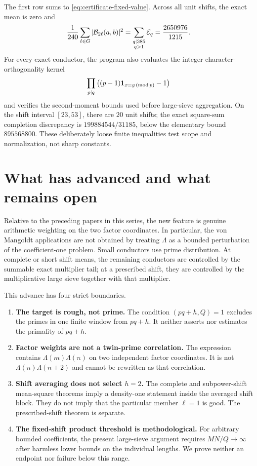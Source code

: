 The first row sums to \eqref{eq:certificate-fixed-value}.  Across all unit shifts, the exact mean is zero and
\begin{equation}\label{eq:certificate-weighted-parseval}
 \frac1{240}\sum_{\ell\in G}|\mathcal B_{2\ell}(a,b)|^2
 =\sum_{\substack{q\mid385\\q>1}}\mathcal E_q
 =\frac{2650976}{1215}.
\end{equation}
For every exact conductor, the program also evaluates the integer character-orthogonality kernel
\[
 \prod_{p\mid q}
 \left((p-1)\mathbf 1_{x\equiv y\, (\mathrm{mod}\,p)}-1\right)
\]
and verifies the second-moment bounds used before large-sieve aggregation.  On the shift interval $[23,53]$, there are $20$ unit shifts; the exact square-sum completion discrepancy is $199884544/31185$, below the elementary bound $895568800$.  These deliberately loose finite inequalities test scope and normalization, not sharp constants.

\section{What has advanced and what remains open}\label{sec:boundaries}

Relative to the preceding papers in this series, the new feature is genuine arithmetic weighting on the two factor coordinates.  In particular, the von Mangoldt applications are not obtained by treating $\Lambda$ as a bounded perturbation of the coefficient-one problem.  Small conductors use prime distribution.  At complete or short shift means, the remaining conductors are controlled by the summable exact multiplier tail; at a prescribed shift, they are controlled by the multiplicative large sieve together with that multiplier.

This advance has four strict boundaries.

\begin{enumerate}[label=\textbf{B\arabic*.},leftmargin=3.2em]
 \item \textbf{The target is rough, not prime.}  The condition $(pq+h,Q)=1$ excludes the primes in one finite window from $pq+h$.  It neither asserts nor estimates the primality of $pq+h$.
 \item \textbf{Factor weights are not a twin-prime correlation.}  The expression contains $\Lambda(m)\Lambda(n)$ on two independent factor coordinates.  It is not $\Lambda(n)\Lambda(n+2)$ and cannot be rewritten as that correlation.
 \item \textbf{Shift averaging does not select $h=2$.}  The complete and subpower-shift mean-square theorems imply a density-one statement inside the averaged shift block.  They do not imply that the particular member $\ell=1$ is good.  The prescribed-shift theorem is separate.
 \item \textbf{The fixed-shift product threshold is methodological.}  For arbitrary bounded coefficients, the present large-sieve argument requires $MN/Q\to\infty$ after harmless lower bounds on the individual lengths.  We prove neither an endpoint nor failure below this range.
\end{enumerate}

